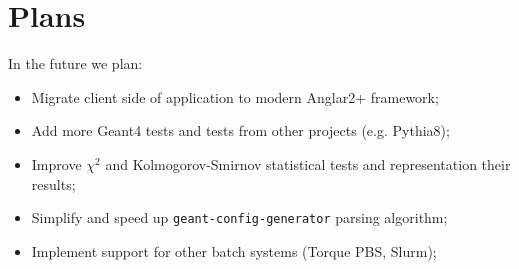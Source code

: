 \section{Plans}
\label{sec-plans}

In the future we plan:
\begin{itemize}
	\item Migrate client side of application to modern Anglar2+ framework;
	\item Add more Geant4 tests and tests from other projects (e.g. Pythia8);
	\item Improve $\chi^2$ and Kolmogorov-Smirnov statistical tests and representation their results;
	\item Simplify and speed up {\tt geant-config-generator} parsing algorithm;
	\item Implement support for other batch systems (Torque PBS, Slurm);
\end{itemize}
